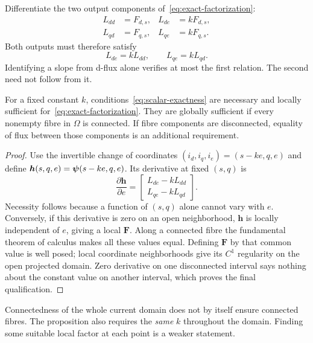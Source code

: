 Differentiate the two output components of~\eqref{eq:exact-factorization}:
\begin{align}
L_{dd}&=F_{d,s},&L_{de}&=kF_{d,s},\\
L_{qd}&=F_{q,s},&L_{qe}&=kF_{q,s}.
\end{align}
Both outputs must therefore satisfy
\begin{equation}\label{eq:scalar-exactness}
\boxed{L_{de}=kL_{dd},\qquad L_{qe}=kL_{qd}.}
\end{equation}
Identifying a slope from d-flux alone verifies at most the first relation. The second need not follow from it.

\begin{proposition}\label{prop:scalar-factorization}
For a fixed constant $k$, conditions~\eqref{eq:scalar-exactness} are necessary and locally sufficient for~\eqref{eq:exact-factorization}. They are globally sufficient if every nonempty fibre in $\Omega$ is connected. If fibre components are disconnected, equality of flux between those components is an additional requirement.
\end{proposition}
\begin{proof}
Use the invertible change of coordinates $(i_d,i_q,i_e)=(s-ke,q,e)$ and define $\bm h(s,q,e)=\bm\psi(s-ke,q,e)$. Its derivative at fixed $(s,q)$ is
\begin{equation}\label{eq:fibre-derivative}
\frac{\partial\bm h}{\partial e}
=\begin{bmatrix}L_{de}-kL_{dd}\\L_{qe}-kL_{qd}\end{bmatrix}.
\end{equation}
Necessity follows because a function of $(s,q)$ alone cannot vary with $e$. Conversely, if this derivative is zero on an open neighborhood, $\bm h$ is locally independent of $e$, giving a local $\bm F$. Along a connected fibre the fundamental theorem of calculus makes all these values equal. Defining $\bm F$ by that common value is well posed; local coordinate neighborhoods give its $C^1$ regularity on the open projected domain. Zero derivative on one disconnected interval says nothing about the constant value on another interval, which proves the final qualification.
\end{proof}

Connectedness of the whole current domain does not by itself ensure connected fibres. The proposition also requires the \emph{same} $k$ throughout the domain. Finding some suitable local factor at each point is a weaker statement.

